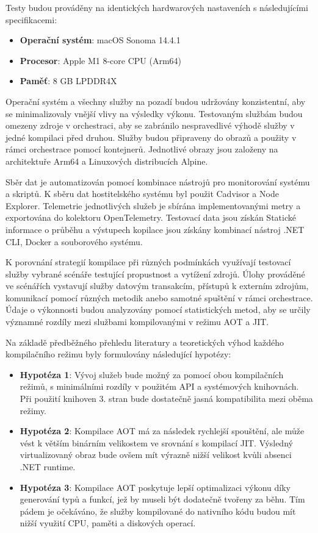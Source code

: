Testy budou prováděny na identických hardwarových nastaveních s následujícími specifikacemi:

\begin{itemize}
    \item \textbf{Operační systém}: macOS Sonoma 14.4.1
    \item \textbf{Procesor}: Apple M1 8-core CPU (Arm64)
    \item \textbf{Paměť}: 8 GB LPDDR4X
\end{itemize}

Operační systém a všechny služby na pozadí budou udržovány konzistentní, aby se minimalizovaly vnější vlivy na výsledky výkonu. Testovaným službám budou omezeny zdroje v orchestraci, aby se zabránilo nespravedlivé výhodě služby v jedné kompilaci před druhou. Služby budou připraveny do obrazů a použity v rámci orchestrace pomocí kontejnerů. Jednotlivé obrazy jsou založeny na architektuře Arm64 a Linuxových distribucích Alpine.

Sběr dat je automatizován pomocí kombinace nástrojů pro monitorování systému a skriptů. K sběru dat hostitelského systému byl použit Cadvisor a Node Explorer. Telemetrie jednotlivých služeb je sbírána implementovanými metry a exportována do kolektoru OpenTelemetry. Testovací data jsou získán Statické informace o průběhu a výstupech kopilace jsou získány kombinací nástroj .NET CLI, Docker a souborového systému.

K porovnání strategií kompilace při různých podmínkách využívají testovací služby vybrané scénáře testující propustnost a vytížení zdrojů. Úlohy prováděné ve scénářích vystavují služby datovým transakcím, přístupů k externím zdrojům, komunikací pomocí různých metodik anebo samotné spuštění v rámci orchestrace. Údaje o výkonnosti budou analyzovány pomocí statistických metod, aby se určily významné rozdíly mezi službami kompilovanými v režimu AOT a JIT. 


Na základě předběžného přehledu literatury a teoretických výhod každého kompilačního režimu byly formulovány následující hypotézy:

\begin{itemize}
    \item \textbf{Hypotéza 1}: Vývoj služeb bude možný za pomocí obou kompilačních režimů, s minimálními rozdíly v použitém API a systémových knihovnách. Při použití knihoven 3. stran bude dostatečně jasná kompatibilita mezi oběma režimy.
    \item \textbf{Hypotéza 2}: Kompilace AOT má za následek rychlejší spouštění, ale může vést k větším binárním velikostem ve srovnání s kompilací JIT. Výsledný virtualizovaný obraz bude ovšem mít výrazně nižší velikost kvůli absenci .NET runtime.
    \item \textbf{Hypotéza 3}: Kompilace AOT poskytuje lepší optimalizaci výkonu díky generování typů a funkcí, jež by museli být dodatečně tvořeny za běhu. Tím pádem je očekáváno, že služby kompilované do nativního kódu budou mít nižší využití CPU, paměti a diskových operací.
\end{itemize}

